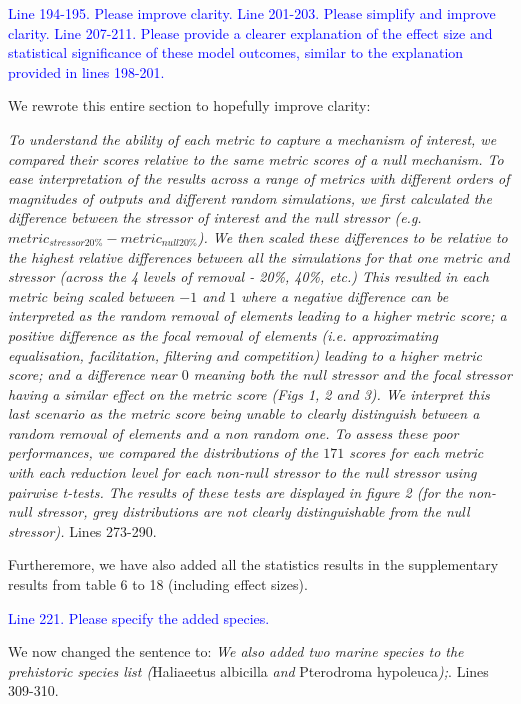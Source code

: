 \documentclass[
]{article}
\begin{document}
\textcolor{blue}{Line 194-195. Please improve clarity.}
\textcolor{blue}{Line 201-203. Please simplify and improve clarity.}
\textcolor{blue}{Line 207-211. Please provide a clearer explanation of the effect size and statistical significance of these model outcomes, similar to the explanation provided in lines 198-201.}

We rewrote this entire section to hopefully improve clarity:

\textit{To understand the ability of each metric to capture a mechanism of interest, we compared their scores relative to the same metric scores of a null mechanism.
To ease interpretation of the results across a range of metrics with different orders of magnitudes of outputs and different random simulations, we first calculated the difference between the stressor of interest and the null stressor (e.g. $metric_{stressor20\%} - metric_{null20\%}$).
We then scaled these differences to be relative to the highest relative differences between all the simulations for that one metric and stressor (across the 4 levels of removal - 20\%, 40\%, etc.)
This resulted in each metric being scaled between $-1$ and $1$ where a negative difference can be interpreted as the random removal of elements leading to a higher metric score; a positive difference as the focal removal of elements (i.e. approximating equalisation, facilitation, filtering and competition) leading to a higher metric score; and a difference near $0$ meaning both the null stressor and the focal stressor having a similar effect on the metric score (Figs 1, 2 and 3).
We interpret this last scenario as the metric score being unable to clearly distinguish between a random removal of elements and a non random one.
To assess these poor performances, we compared the distributions of the $171$ scores for each metric with each reduction level for each non-null stressor to the null stressor using pairwise t-tests.
The results of these tests are displayed in figure 2 (for the non-null stressor, grey distributions are not clearly distinguishable from the null stressor).}
Lines 273-290.

Furtheremore, we have also added all the statistics results in the supplementary results from table 6 to 18 (including effect sizes).

\textcolor{blue}{Line 221. Please specify the added species.}

We now changed the sentence to:
\textit{We also added two marine species to the prehistoric species list (}Haliaeetus albicilla\textit{ and }Pterodroma hypoleuca\textit{);}. Lines 309-310.
\end{document}
